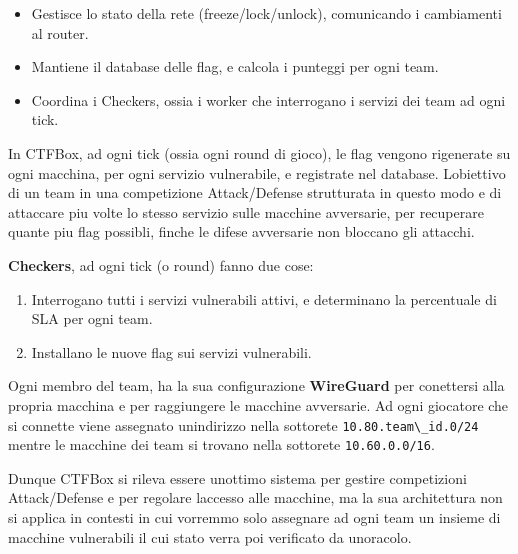 \begin{itemize}
\tightlist
\item
  Gestisce lo stato della rete (freeze/lock/unlock), comunicando i
  cambiamenti al router.
\item
  Mantiene il database delle flag, e calcola i punteggi per ogni team.
\item
  Coordina i Checkers, ossia i worker che interrogano i servizi dei team
  ad ogni tick.
\end{itemize}

In CTFBox, ad ogni tick (ossia ogni round di gioco), le flag vengono
rigenerate su ogni macchina, per ogni servizio vulnerabile, e registrate
nel database. L\textquotesingle obiettivo di un team in una competizione
Attack/Defense strutturata in questo modo e\textquotesingle{} di
attaccare piu volte lo stesso servizio sulle macchine avversarie, per
recuperare quante piu flag possibli, finche le difese avversarie non
bloccano gli attacchi.

\textbf{Checkers}, ad ogni tick (o round) fanno due cose:

\begin{enumerate}
\def\labelenumi{\arabic{enumi}.}
\tightlist
\item
  Interrogano tutti i servizi vulnerabili attivi, e determinano la
  percentuale di SLA per ogni team.
\item
  Installano le nuove flag sui servizi vulnerabili.
\end{enumerate}

Ogni membro del team, ha la sua configurazione \textbf{WireGuard} per
conettersi alla propria macchina e per raggiungere le macchine
avversarie. Ad ogni giocatore che si connette viene assegnato
un\textquotesingle indirizzo nella sottorete
\passthrough{\lstinline!10.80.team\_id.0/24!} mentre le macchine dei
team si trovano nella sottorete \passthrough{\lstinline!10.60.0.0/16!}.

Dunque CTFBox si rileva essere un\textquotesingle ottimo sistema per
gestire competizioni Attack/Defense e per regolare
l\textquotesingle accesso alle macchine, ma la sua architettura non si
applica in contesti in cui vorremmo solo assegnare ad ogni team un
insieme di macchine vulnerabili il cui stato verra\textquotesingle{} poi
verificato da un\textquotesingle oracolo.
